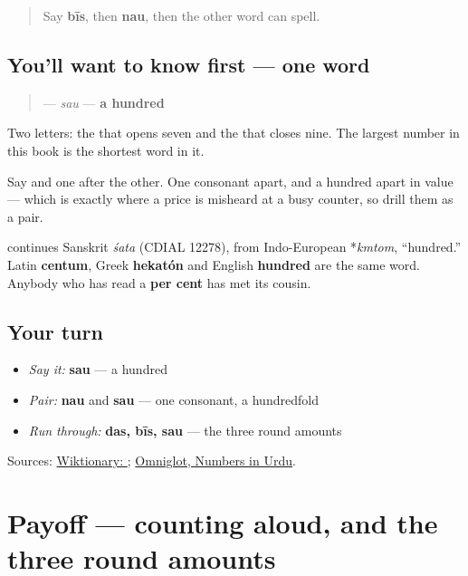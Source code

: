 \begin{quote}
Say \textbf{bīs}, then \textbf{nau}, then the other word \textbf{} can spell.
\end{quote}

\subsection*{You'll want to know first — one word}
\begin{quote}
\textbf{} — \emph{sau} — \textbf{a hundred}
\end{quote}

Two letters: the \textbf{} that opens seven and the \textbf{} that closes nine. The largest number in this book is the shortest word in it.

Say \textbf{} and \textbf{} one after the other. One consonant apart, and a hundred apart in value — which is exactly where a price is misheard at a busy counter, so drill them as a pair.

\begin{cousinweb}
\textbf{} continues Sanskrit \emph{śata} (CDIAL 12278), from Indo-European *\emph{kmtom}, \textquotedblleft{}hundred.\textquotedblright{} Latin \textbf{centum}, Greek \textbf{hekatón} and English \textbf{hundred} are the same word. Anybody who has read a \textbf{per cent} has met its cousin.
\end{cousinweb}

\subsection*{Your turn}
\begin{itemize}
\raggedright
  \item \emph{Say it:} \textbf{sau} — a hundred
  \item \emph{Pair:} \textbf{nau} and \textbf{sau} — one consonant, a hundredfold
  \item \emph{Run through:} \textbf{das, bīs, sau} — the three round amounts
\end{itemize}

\begin{tcolorbox}[breakable,colback=teal!4,colframe=teal!35!black,title={Before you move on}]
Sources: \href{https://en.wiktionary.org/wiki/\%D8\%B3\%D9\%88}{Wiktionary: }; \href{https://www.omniglot.com/language/numbers/urdu.htm}{Omniglot, Numbers in Urdu}.
\end{tcolorbox}
\section[Practice]{Payoff — counting aloud, and the three round amounts}

